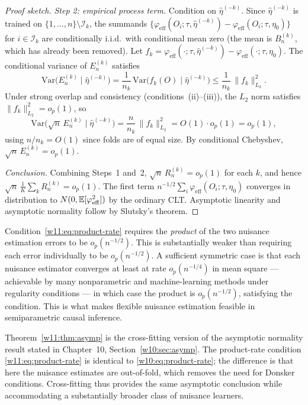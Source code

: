 \documentclass[master.tex]{subfiles}
\begin{document}
\begin{proof}[Proof sketch]
\medskip
\noindent\textit{Step 2: empirical process term.}\enspace
Condition on $\hat\eta^{(-k)}$.  Since $\hat\eta^{(-k)}$ is
trained on $\{1,\ldots,n\}\setminus\mathcal{I}_k$, the summands
$\bigl\{\varphi_{\mathrm{eff}}(O_i;\tau,\hat\eta^{(-k)}) -
\varphi_{\mathrm{eff}}(O_i;\tau,\eta_0)\bigr\}$ for
$i\in\mathcal{I}_k$ are conditionally i.i.d.\ with conditional mean
zero (the mean is $B_n^{(k)}$, which has already been removed).
Let $f_k = \varphi_{\mathrm{eff}}(\cdot;\tau,\hat\eta^{(-k)}) -
\varphi_{\mathrm{eff}}(\cdot;\tau,\eta_0)$.  The conditional
variance of $E_n^{(k)}$ satisfies
\[
  \mathrm{Var}\bigl(E_n^{(k)}\mid\hat\eta^{(-k)}\bigr)
  =
  \frac{1}{n_k}\,\mathrm{Var}\bigl(f_k(O)\mid\hat\eta^{(-k)}\bigr)
  \leq
  \frac{1}{n_k}\,\|f_k\|_{L_2}^2.
\]
Under strong overlap and consistency (conditions~(ii)--(iii)), the
$L_2$ norm satisfies $\|f_k\|_{L_2}^2 = o_p(1)$, so
\[
  \mathrm{Var}\bigl(\sqrt{n}\,E_n^{(k)}\mid\hat\eta^{(-k)}\bigr)
  =
  \frac{n}{n_k}\,\|f_k\|_{L_2}^2
  = O(1)\cdot o_p(1)
  = o_p(1),
\]
using $n/n_k = O(1)$ since folds are of equal size.  By conditional
Chebyshev, $\sqrt{n}\,E_n^{(k)} = o_p(1)$.

\medskip
\noindent\textit{Conclusion.}\enspace
Combining Steps~1 and~2, $\sqrt{n}\,R_n^{(k)} = o_p(1)$ for each
$k$, and hence $\sqrt{n}\,\frac{1}{K}\sum_k R_n^{(k)} = o_p(1)$.
The first term $n^{-1/2}\sum_i\varphi_{\mathrm{eff}}(O_i;\tau,\eta_0)$
converges in distribution to $N(0, \mathbb{E}[\varphi_{\mathrm{eff}}^2])$
by the ordinary CLT.  Asymptotic linearity and asymptotic normality
follow by Slutsky's theorem.
\end{proof}

\begin{remark}
\label{w11:rem:product-rate}
Condition~\eqref{w11:eq:product-rate} requires the \emph{product}
of the two nuisance estimation errors to be $o_p(n^{-1/2})$.  This
is substantially weaker than requiring each error individually to
be $o_p(n^{-1/2})$.  A sufficient symmetric case is that each nuisance estimator
converges at least at rate $o_p(n^{-1/4})$ in mean square —
achievable by many nonparametric and machine-learning methods
under regularity conditions — in which case the product is
$o_p(n^{-1/2})$, satisfying the condition.  This is what makes
flexible nuisance estimation feasible in semiparametric causal
inference.
\end{remark}

\begin{remark}
\label{w11:rem:ch10-link}
Theorem~\ref{w11:thm:asymp} is the cross-fitting version of the
asymptotic normality result stated in Chapter~10,
Section~\ref{w10:sec:asymp}.  The product-rate condition
\eqref{w11:eq:product-rate} is identical to \eqref{w10:eq:product-rate};
the difference is that here the nuisance estimates are out-of-fold,
which removes the need for Donsker conditions.  Cross-fitting thus
provides the same asymptotic conclusion while accommodating a
substantially broader class of nuisance learners.
\end{remark}
\end{document}
